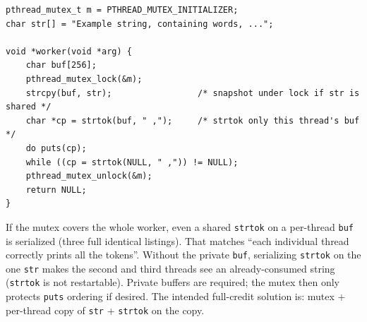 \documentclass[11pt,a4paper]{article}
\newenvironment{Sol}{%
  \begin{tcolorbox}[sboxstyle, title={Solution}]%
}{%
  \end{tcolorbox}\vspace{0.35em}%
}
\begin{document}
\begin{Sol}
\begin{lstlisting}[numbers=none]
pthread_mutex_t m = PTHREAD_MUTEX_INITIALIZER;
char str[] = "Example string, containing words, ...";

void *worker(void *arg) {
    char buf[256];
    pthread_mutex_lock(&m);
    strcpy(buf, str);                 /* snapshot under lock if str is shared */
    char *cp = strtok(buf, " ,");     /* strtok only this thread's buf */
    do puts(cp);
    while ((cp = strtok(NULL, " ,")) != NULL);
    pthread_mutex_unlock(&m);
    return NULL;
}
\end{lstlisting}

If the mutex covers the whole worker, even a shared \texttt{strtok} on a per-thread \texttt{buf} is serialized (three full identical listings). That matches ``each individual thread correctly prints all the tokens''. Without the private \texttt{buf}, serializing \texttt{strtok} on the one \texttt{str} makes the second and third threads see an already-consumed string (\texttt{strtok} is not restartable). Private buffers are required; the mutex then only protects \texttt{puts} ordering if desired. The intended full-credit solution is: mutex + per-thread copy of \texttt{str} + \texttt{strtok} on the copy.
\end{Sol}
\end{document}
